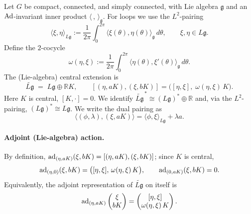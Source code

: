 \documentclass[12pt]{article}
\begin{document}
\begin{remark}
    Let $G$ be compact, connected, and simply connected, with Lie algebra $\mathfrak g$
    and an $\operatorname{Ad}$-invariant inner product $\langle\,,\,\rangle_{\mathfrak g}$.
    For loops we use the $L^2$-pairing
    \[
        \langle \xi,\eta\rangle_{L\mathfrak g}
        := \frac{1}{2\pi}\int_0^{2\pi}\langle \xi(\theta),\eta(\theta)\rangle_{\mathfrak g}\,d\theta,
        \qquad \xi,\eta\in L\mathfrak g .
    \]
    Define the $2$-cocycle
    \[
        \omega(\eta,\xi)
        := \frac{1}{2\pi}\int_0^{2\pi}\!\!\langle \eta(\theta),\xi'(\theta)\rangle_{\mathfrak g}\,d\theta.
    \]
    The (Lie-algebra) central extension is
    \[
        \widetilde{L\mathfrak g} \;=\; L\mathfrak g \oplus \mathbb R K,
        \qquad
        [(\eta,aK),(\xi,bK)]
        = \big([\eta,\xi],\;\omega(\eta,\xi)\,K\big).
    \]
    Here $K$ is central, $[K,\cdot]=0$.
    We identify $\widetilde{L\mathfrak g}^{\,*}\cong (L\mathfrak g)^*\oplus\mathbb R$ and,
    via the $L^2$-pairing, $(L\mathfrak g)^*\cong L\mathfrak g$.
    We write the dual pairing as
    \[
        \big\langle (\phi,\lambda),(\xi,aK)\big\rangle
        = \langle \phi,\xi\rangle_{L\mathfrak g} + \lambda a .
    \]

    \paragraph{Adjoint (Lie-algebra) action.}
    By definition, $\operatorname{ad}_{(\eta,aK)}(\xi,bK)=[(\eta,aK),(\xi,bK)]$; since $K$ is central,
    \[
        \operatorname{ad}_{(\eta,0)}(\xi,bK) = \big([\eta,\xi],\,\omega(\eta,\xi)\,K\big), \qquad
        \operatorname{ad}_{(0,aK)}(\xi,bK)=0 .
    \]
    Equivalently, the adjoint representation of $\widetilde{L\mathfrak g}$ on itself is
    \[
        \operatorname{ad}_{(\eta,aK)}
        \begin{pmatrix}\xi\\ bK\end{pmatrix}
        =
        \begin{pmatrix}
            [\eta,\xi] \\ \omega(\eta,\xi)\,K
        \end{pmatrix}.
    \]


\end{remark}
\end{document}

